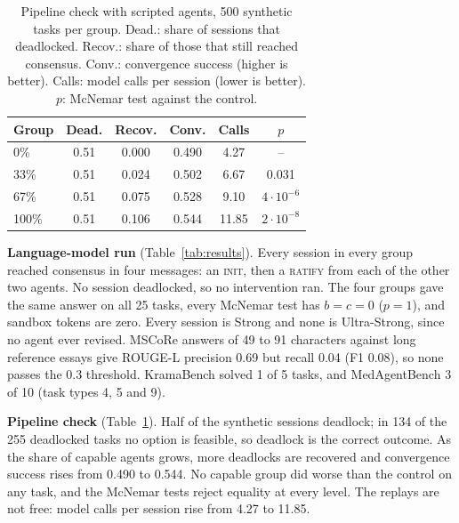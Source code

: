 \documentclass[11pt,a4paper,twocolumn]{article}
\begin{document}
\begin{table}[t]
\centering
\small
\begin{tabular}{@{}lccccc@{}}
\toprule
Group & Dead. & Recov. & Conv. & Calls & $p$ \\
\midrule
0\% & 0.51 & 0.000 & 0.490 & 4.27 & -- \\
33\% & 0.51 & 0.024 & 0.502 & 6.67 & 0.031 \\
67\% & 0.51 & 0.075 & 0.528 & 9.10 & $4\cdot10^{-6}$ \\
100\% & 0.51 & 0.106 & 0.544 & 11.85 & $2\cdot10^{-8}$ \\
\bottomrule
\end{tabular}
\caption{Pipeline check with scripted agents, 500 synthetic tasks per group. Dead.: share of
sessions that deadlocked. Recov.: share of those that still reached consensus. Conv.:
convergence success (higher is better). Calls: model calls per session (lower is better).
$p$: McNemar test against the control.}
\label{tab:mock}
\end{table}

\textbf{Language-model run} (Table~\ref{tab:results}). Every session in every group reached
consensus in four messages: an \textsc{init}, then a \textsc{ratify} from each of the other two
agents. No session deadlocked, so no intervention ran. The four groups gave the same answer on
all 25 tasks, every McNemar test has $b=c=0$ ($p=1$), and sandbox tokens are zero. Every session
is Strong and none is Ultra-Strong, since no agent ever revised. MSCoRe answers of 49 to 91
characters against long reference essays give ROUGE-L precision 0.69 but recall 0.04 (F1 0.08),
so none passes the 0.3 threshold. KramaBench solved 1 of 5 tasks, and MedAgentBench 3 of 10
(task types 4, 5 and 9).

\textbf{Pipeline check} (Table~\ref{tab:mock}). Half of the synthetic sessions deadlock; in 134
of the 255 deadlocked tasks no option is feasible, so deadlock is the correct outcome. As the
share of capable agents grows, more deadlocks are recovered and convergence success rises from
0.490 to 0.544. No capable group did worse than the control on any task, and the McNemar tests
reject equality at every level. The replays are not free: model calls per session rise from
4.27 to 11.85.
\end{document}
